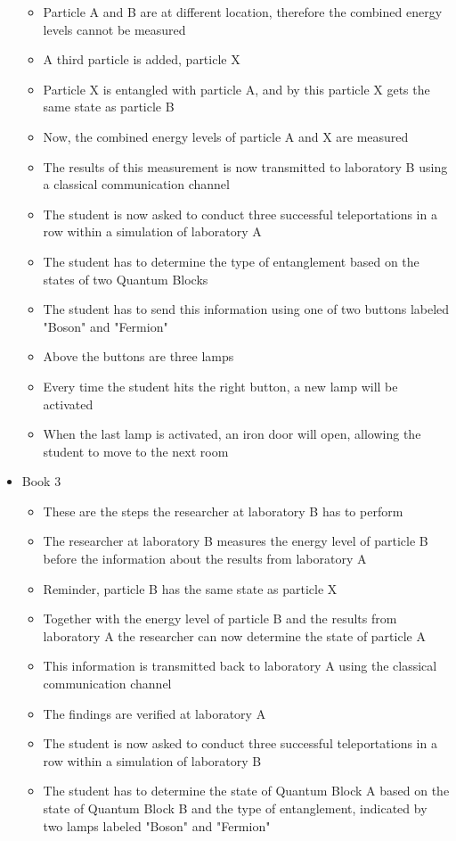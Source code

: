 \documentclass[11pt,twoside]{report} %
\begin{document}
\begin{itemize}
\begin{itemize}
		\item Particle A and B are at different location, therefore the combined energy levels cannot be measured
		\item A third particle is added, particle X
		\item Particle X is entangled with particle A, and by this particle X gets the same state as particle B
		\item Now, the combined energy levels of particle A and X are measured
		\item The results of this measurement is now transmitted to laboratory B using a classical communication channel
		\item The student is now asked to conduct three successful teleportations in a row within a simulation of laboratory A
		\item The student has to determine the type of entanglement based on the states of two Quantum Blocks
		\item The student has to send this information using one of two buttons labeled "Boson" and "Fermion"
		\item Above the buttons are three lamps
		\item Every time the student hits the right button, a new lamp will be activated
		\item When the last lamp is activated, an iron door will open, allowing the student to move to the next room
	\end{itemize}
	\item Book 3
	\begin{itemize}
		\item These are the steps the researcher at laboratory B has to perform
		\item The researcher at laboratory B measures the energy level of particle B before the information about the results from laboratory A
		\item Reminder, particle B has the same state as particle X
		\item Together with the energy level of particle B and the results from laboratory A the researcher can now determine the state of particle A
		\item This information is transmitted back to laboratory A using the classical communication channel
		\item The findings are verified at laboratory A
		\item The student is now asked to conduct three successful teleportations in a row within a simulation of laboratory B
		\item The student has to determine the state of Quantum Block A based on the state of Quantum Block B and the type of entanglement, indicated by two lamps labeled "Boson" and "Fermion"

\end{itemize}
\end{itemize}
\end{document}
